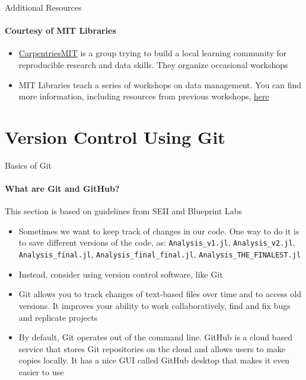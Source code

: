 \documentclass[10pt, aspectratio=169, xcolor=dvipsnames]{beamer}
\let\olditem\item
\renewcommand{\item}{%
\olditem\vspace{0.3em}}
\begin{document}
\begin{frame}[t]{Additional Resources}
    \framesubtitle{Courtesy of MIT Libraries}

    \normalsize\vspace{0.5em} \begin{itemize}
        \item \href{https://docs.google.com/presentation/d/1UAtzDXer3DuLw-Wi9eAC8gwWY8XpMUAXViUCVcVupCU/edit?pli=1#slide=id.g1505c029de4_0_225}{CarpentriesMIT} is a group trying to build a local learning community for reproducible research and data skills.
              They organize occasional workshops
        \item MIT Libraries teach a series of workshops on data management. You can find more information, including resources from previous workshops, \href{https://libraries.mit.edu/data-management/services/workshops/}{here}
    \end{itemize}
\end{frame}

\section{Version Control Using Git}
\begin{frame}[t]{Basics of Git}
    \framesubtitle{What are Git and GitHub?}
    \footnotesize This section is based on guidelines from SEII and Blueprint Labs

    \normalsize\vspace{0.5em}
    \begin{itemize}
        \item Sometimes we want to keep track of changes in our code. One way to do it is to save different versions of the code, as: \texttt{Analysis\_v1.jl}, \texttt{Analysis\_v2.jl}, \texttt{Analysis\_final.jl}, \texttt{Analysis\_final\_final.jl}, \texttt{Analysis\_THE\_FINALEST.jl}
        \item Instead, consider using version control software, like Git
        \item Git allows you to track changes of text-based files over time and to access old versions. It improves your ability to work collaboratively, find and fix bugs and replicate projects
        \item By default, Git operates out of the command line. GitHub is a cloud based service that stores Git repositories on the cloud and allows users to make copies locally. It has a nice GUI called GitHub desktop that makes it even easier to use
    \end{itemize}
\end{frame}
\end{document}
